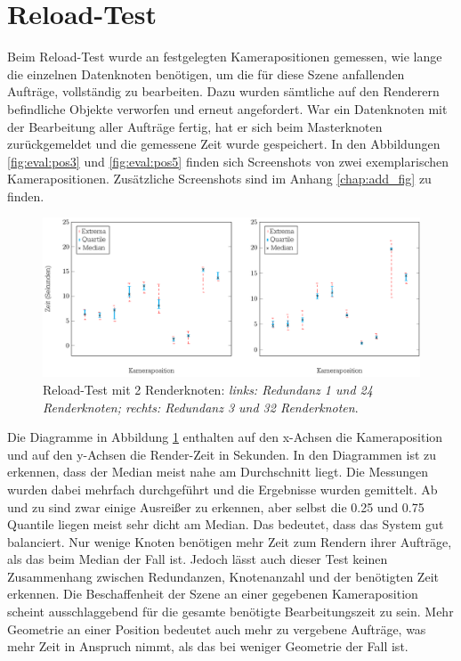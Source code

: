 \section{Reload-Test}
\label{sec:eval:reload}
Beim Reload-Test wurde an festgelegten Kamerapositionen gemessen, wie lange die einzelnen Datenknoten benötigen, um die für diese Szene anfallenden Aufträge, vollständig zu bearbeiten. Dazu wurden sämtliche auf den Renderern befindliche Objekte verworfen und erneut angefordert. War ein Datenknoten mit der Bearbeitung aller Aufträge fertig, hat er sich beim Masterknoten zurückgemeldet und die gemessene Zeit wurde gespeichert. In den Abbildungen \ref{fig:eval:pos3} und \ref{fig:eval:pos5} finden sich Screenshots von zwei exemplarischen Kamerapositionen. Zusätzliche Screenshots sind im Anhang \ref{chap:add_fig} zu finden.\\
\begin{figure}
\centering
\includegraphics[scale=0.75]{images/diag_reload.pdf}
  \caption{\label{fig:eval:reload}Reload-Test mit 2 Renderknoten: \textit{links: Redundanz 1 und 24 Renderknoten; rechts: Redundanz 3 und 32 Renderknoten}.}
\end{figure}
Die Diagramme in Abbildung \ref{fig:eval:reload} enthalten auf den x-Achsen die Kameraposition und auf den y-Achsen die Render-Zeit in Sekunden. In den Diagrammen ist zu erkennen, dass der Median meist nahe am Durchschnitt liegt. Die Messungen wurden dabei mehrfach durchgeführt und die Ergebnisse wurden gemittelt. Ab und zu sind zwar einige Ausreißer zu erkennen, aber selbst die 0.25 und 0.75 Quantile liegen meist sehr dicht am Median. Das bedeutet, dass das System gut balanciert. Nur wenige Knoten benötigen mehr Zeit zum Rendern ihrer Aufträge, als das beim Median der Fall ist. Jedoch lässt auch dieser Test keinen Zusammenhang zwischen Redundanzen, Knotenanzahl und der benötigten Zeit erkennen. Die Beschaffenheit der Szene an einer gegebenen Kameraposition scheint ausschlaggebend für die gesamte benötigte Bearbeitungszeit zu sein. Mehr Geometrie an einer Position bedeutet auch mehr zu vergebene Aufträge, was mehr Zeit in Anspruch nimmt, als das bei weniger Geometrie der Fall ist.
